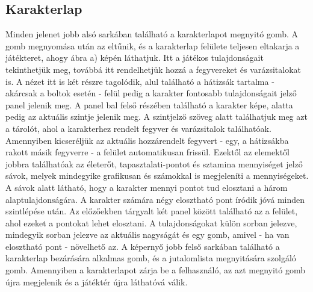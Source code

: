 \subsection*{Karakterlap}
\label{karakterlap}
Minden jelenet jobb alsó sarkában található a karakterlapot megnyitó gomb. 
A gomb megnyomása után az eltűnik, és a karakterlap felülete teljesen eltakarja a játékteret, ahogy  ábra a) képén láthatjuk. 
Itt a játékos tulajdonságait tekinthetjük meg, továbbá itt rendelhetjük hozzá a fegyvereket és varázsitalokat is. 
A nézet itt is két részre tagolódik, alul található a hátizsák tartalma - akárcsak a boltok esetén - felül pedig a karakter fontosabb tulajdonságait jelző panel jelenik meg. 
A panel bal felső részében található a karakter képe, alatta pedig az aktuális szintje jelenik meg. 
A szintjelző szöveg alatt találhatjuk meg azt a tárolót, ahol a karakterhez rendelt fegyver és varázsitalok találhatóak. 
Amennyiben kicseréljük az aktuális hozzárendelt fegyvert - egy, a hátizsákba rakott másik fegyverre - a felület automatikusan frissül. 
Ezektől az elemektől jobbra találhatóak az életerőt, tapasztalati-pontot és sztamina mennyiséget jelző sávok, melyek mindegyike grafikusan és számokkal is megjeleníti a mennyiségeket. 
A sávok alatt látható, hogy a karakter mennyi pontot tud elosztani a három alaptulajdonságára. 
A karakter számára négy elosztható pont íródik jóvá minden szintlépése után. 
Az előzőekben tárgyalt két panel között található az a felület, ahol ezeket a pontokat lehet elosztani. 
A tulajdonságokat külön sorban jelezve, mindegyik sorban jelezve az aktuális nagyságát és egy gomb, amivel - ha van elosztható pont - növelhető az. 
A képernyő jobb felső sarkában található a karakterlap bezárására alkalmas gomb, és a jutalomlista megnyitására szolgáló gomb. 
Amennyiben a karakterlapot zárja be a felhasználó, az azt megnyitó gomb újra megjelenik és a játéktér újra láthatóvá válik.



